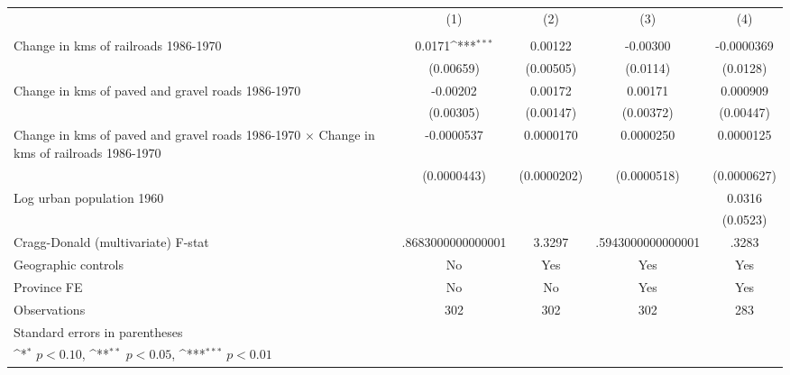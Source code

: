 {
\def\sym#1{\ifmmode^{#1}\else\(^{#1}\)\fi}
\begin{tabular}{l*{4}{c}}
\hline\hline
                &\multicolumn{1}{c}{(1)}&\multicolumn{1}{c}{(2)}&\multicolumn{1}{c}{(3)}&\multicolumn{1}{c}{(4)}\\
                &\multicolumn{1}{c}{}&\multicolumn{1}{c}{}&\multicolumn{1}{c}{}&\multicolumn{1}{c}{}\\
\hline
Change in kms of railroads 1986-1970&   0.0171\sym{***}&  0.00122         & -0.00300         &-0.0000369         \\
                &(0.00659)         &(0.00505)         & (0.0114)         & (0.0128)         \\
[1em]
Change in kms of paved and gravel roads 1986-1970& -0.00202         &  0.00172         &  0.00171         & 0.000909         \\
                &(0.00305)         &(0.00147)         &(0.00372)         &(0.00447)         \\
[1em]
Change in kms of paved and gravel roads 1986-1970 $\times$ Change in kms of railroads 1986-1970&-0.0000537         &0.0000170         &0.0000250         &0.0000125         \\
                &(0.0000443)         &(0.0000202)         &(0.0000518)         &(0.0000627)         \\
[1em]
Log urban population 1960&                  &                  &                  &   0.0316         \\
                &                  &                  &                  & (0.0523)         \\
\hline
Cragg-Donald (multivariate) F-stat&.8683000000000001         &   3.3297         &.5943000000000001         &    .3283         \\
Geographic controls&       No         &      Yes         &      Yes         &      Yes         \\
Province FE     &       No         &       No         &      Yes         &      Yes         \\
Observations    &      302         &      302         &      302         &      283         \\
\hline\hline
\multicolumn{5}{l}{\footnotesize Standard errors in parentheses}\\
\multicolumn{5}{l}{\footnotesize \sym{*} \(p<0.10\), \sym{**} \(p<0.05\), \sym{***} \(p<0.01\)}\\
\end{tabular}
}
